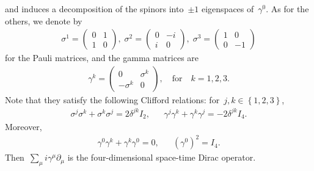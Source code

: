 \documentclass[10pt,a4paper]{amsart}
\newcommand{\p}{\partial}
\newcommand{\braces}[1]{\left\{#1\right\}} %
\begin{document}
and induces a decomposition of the spinors into~$\pm1$ eigenspaces of~$\gamma^0$.
As for the others, we denote by
\begin{align}
    {\sigma^1} = \left( {\begin{array}{*{20}{c}}
			{0}&1 \\
			1&{0}
	\end{array}} \right),\;{\sigma^2} = \left( {\begin{array}{*{20}{c}}
			{0}&{ - i} \\
			i&{0}
	\end{array}} \right),\;{\sigma^3} = \left( {\begin{array}{*{20}{c}}
			1&{0} \\
			{0}&{ - 1}
	\end{array}} \right)
\end{align}
for the Pauli matrices, and the gamma matrices are
\begin{align}
    {\gamma^k} = \left( {\begin{array}{*{20}{c}}
			{0}&{{\sigma^k}} \\
			{{-\sigma^k}}&{0}
	\end{array}} \right),\quad\text{for}\quad k= 1, 2, 3.
\end{align}
Note that they satisfy the following Clifford relations: for~$j,k\in\braces{1,2,3}$,
\begin{align}
    \sigma^j\sigma^k+\sigma^k\sigma^j= 2\delta^{jk}I_2, & &
    \gamma^j\gamma^k + \gamma^k\gamma^j= -2\delta^{jk}I_4.
\end{align}
Moreover,
\begin{align}
    \gamma^0\gamma^k + \gamma^k \gamma^0 =0, & &
    (\gamma^0)^2=I_4.
\end{align}
Then~$\sum_{\mu} i\gamma^\mu \p_\mu$ is the four-dimensional space-time Dirac operator.
\end{document}
